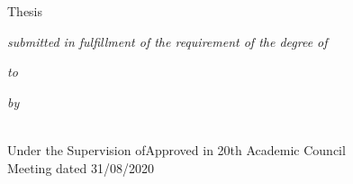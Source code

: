 \begin{titlepage}
    \centering
    {\LARGE \bfseries \ReportTitel}
    \vspace{1.5\baselineskip}
    
    {\large Thesis}
    \vspace{1.5\baselineskip}

    {\large \it{submitted in fulfillment of the requirement of the degree of}}
    \vspace{1\baselineskip}

    {\Large \Degree}
    \vspace{1\baselineskip}

    {\large \it{to}}
    \vspace{1\baselineskip}

    {\large \it{\NUniv}}
    \vspace{1\baselineskip}

    {\large \it{by}}
    \vspace{1\baselineskip}

    {\large \FAuthor}
    \vspace{1\baselineskip}

    \regNo\\

    Under the Supervision ofApproved in 20th Academic Council \\
    \vfil
    Meeting dated 31/08/2020
\end{titlepage}
